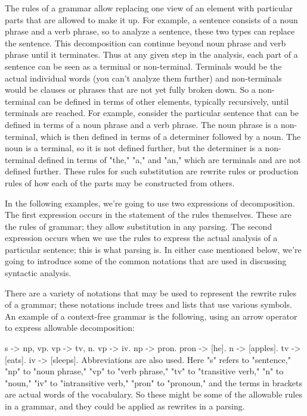 The rules of a grammar allow replacing one view of an element with particular parts that are allowed to make it up. For example, a sentence consists of a noun phrase and a verb phrase, so to analyze a sentence, these two types can replace the sentence. This decomposition can continue beyond noun phrase and verb phrase until it terminates. Thus at any given step in the analysis, each part of a sentence can be seen as a terminal or non-terminal. Terminals would be the actual individual words (you can't analyze them further) and non-terminals would be clauses or phrases that are not yet fully broken down. So a non-terminal can be defined in terms of other elements, typically recursively, until terminals are reached. For example, consider the particular sentence that can be defined in terms of a noun phrase and a verb phrase. The noun phrase is a non-terminal, which is then defined in terms of a determiner followed by a noun. The noun is a terminal, so it is not defined further, but the determiner is a non-terminal defined in terms of "the," "a," and "an," which are terminals and are not defined further. These rules for such substitution are rewrite rules or production rules of how each of the parts may be constructed from others.

In the following examples, we're going to use two expressions of decomposition. The first expression occurs in the statement of the rules themselves. These are the rules of grammar; they allow substitution in any parsing. The second expression occurs when we use the rules to express the actual analysis of a particular sentence; this is what parsing is. In either case mentioned below, we're going to introduce some of the common notations that are used in discussing syntactic analysis.

There are a variety of notations that may be used to represent the rewrite rules of a grammar; these notations include trees and lists that use various symbols. An example of a context-free grammar is the following, using an arrow operator to express allowable decomposition:

s -> np, vp.
vp -> tv, n.
vp -> iv.
np -> pron.
pron -> [he].
n -> [apples].
tv -> [eats].
iv -> [sleeps].
Abbreviations are also used. Here "s" refers to "sentence," "np" to "noun phrase," "vp" to "verb phrase," "tv" to "transitive verb," "n" to "noun," "iv" to "intransitive verb," "pron" to "pronoun," and the terms in brackets are actual words of the vocabulary. So these might be some of the allowable rules in a grammar, and they could be applied as rewrites in a parsing.

